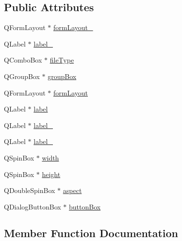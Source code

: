 \subsection*{Public Attributes}
\begin{DoxyCompactItemize}
\item 
Q\+Form\+Layout $\ast$ \mbox{\hyperlink{class_ui___graph_export_properties_a5a1139a6186fd35630f6413f0b284f26}{form\+Layout\+\_}}
\item 
Q\+Label $\ast$ \mbox{\hyperlink{class_ui___graph_export_properties_afad676c8181f3542550ca8965ee36dd3}{label\+\_}}
\item 
Q\+Combo\+Box $\ast$ \mbox{\hyperlink{class_ui___graph_export_properties_a76e16a27bfdce3ee278d48f660e1a0c8}{file\+Type}}
\item 
Q\+Group\+Box $\ast$ \mbox{\hyperlink{class_ui___graph_export_properties_a19574287997bf0322a7227a3d0cd1954}{group\+Box}}
\item 
Q\+Form\+Layout $\ast$ \mbox{\hyperlink{class_ui___graph_export_properties_a8a240c55fd68f7aa9bdb5260ad881c86}{form\+Layout}}
\item 
Q\+Label $\ast$ \mbox{\hyperlink{class_ui___graph_export_properties_a711fe6ca71d11925f6bdeb4b5e0e649d}{label}}
\item 
Q\+Label $\ast$ \mbox{\hyperlink{class_ui___graph_export_properties_aa139c634c29cd957a19865c1b0106666}{label\+\_}}
\item 
Q\+Label $\ast$ \mbox{\hyperlink{class_ui___graph_export_properties_a0faaadf347d4652881ebc9b6c1c7ce7f}{label\+\_}}
\item 
Q\+Spin\+Box $\ast$ \mbox{\hyperlink{class_ui___graph_export_properties_a017e06a0988d41d4cb2bf72b2b5ce937}{width}}
\item 
Q\+Spin\+Box $\ast$ \mbox{\hyperlink{class_ui___graph_export_properties_a4bc99c9655de5d93d30931142a22b7df}{height}}
\item 
Q\+Double\+Spin\+Box $\ast$ \mbox{\hyperlink{class_ui___graph_export_properties_a6c8a9e55fe6dfb6e7675a0abf709468b}{aspect}}
\item 
Q\+Dialog\+Button\+Box $\ast$ \mbox{\hyperlink{class_ui___graph_export_properties_a7eb67fb58e3e66431c929e2905f735d7}{button\+Box}}
\end{DoxyCompactItemize}


\subsection{Member Function Documentation}
\mbox{\label{class_ui___graph_export_properties_a4c411ef3f2c13425a1d08da19dbb276b}} 
